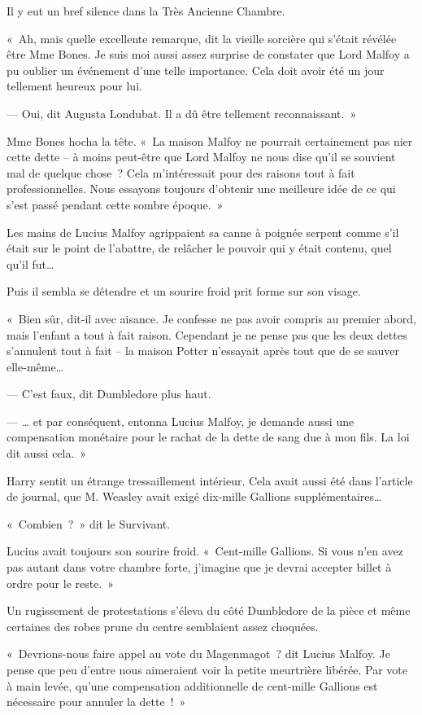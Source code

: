 Il y eut un bref silence dans la Très Ancienne Chambre.

«~Ah, mais quelle excellente remarque, dit la vieille sorcière qui s'était révélée être Mme Bones. Je suis moi aussi assez surprise de constater que Lord Malfoy a pu oublier un événement d'une telle importance. Cela doit avoir été un jour tellement heureux pour lui.

--- Oui, dit Augusta Londubat. Il a dû être tellement reconnaissant.~»

Mme Bones hocha la tête. «~La maison Malfoy ne pourrait certainement pas nier cette dette -- à moins peut-être que Lord Malfoy ne nous dise qu'il se souvient mal de quelque chose~? Cela m'intéressait pour des raisons tout à fait professionnelles. Nous essayons toujours d'obtenir une meilleure idée de ce qui s'est passé pendant cette sombre époque.~»

Les mains de Lucius Malfoy agrippaient sa canne à poignée serpent comme s'il était sur le point de l'abattre, de relâcher le pouvoir qui y était contenu, quel qu'il fut…

Puis il sembla se détendre et un sourire froid prit forme sur son visage.

«~Bien sûr, dit-il avec aisance. Je confesse ne pas avoir compris au premier abord, mais l'enfant a tout à fait raison. Cependant je ne pense pas que les deux dettes s'annulent tout à fait -- la maison Potter n'essayait après tout que de se sauver elle-même…

--- C'est faux, dit Dumbledore plus haut.

--- … et par conséquent, entonna Lucius Malfoy, je demande aussi une compensation monétaire pour le rachat de la dette de sang due à mon fils. La loi dit aussi cela.~»

Harry sentit un étrange tressaillement intérieur. Cela avait aussi été dans l'article de journal, que M. Weasley avait exigé dix-mille Gallions supplémentaires…

«~Combien~?~» dit le Survivant.

Lucius avait toujours son sourire froid. «~Cent-mille Gallions. Si vous n'en avez pas autant dans votre chambre forte, j'imagine que je devrai accepter billet à ordre pour le reste.~»

Un rugissement de protestations s'éleva du côté Dumbledore de la pièce et même certaines des robes prune du centre semblaient assez choquées.

«~Devrions-nous faire appel au vote du Magenmagot~? dit Lucius Malfoy. Je pense que peu d'entre nous aimeraient voir la petite meurtrière libérée. Par vote à main levée, qu'une compensation additionnelle de cent-mille Gallions est nécessaire pour annuler la dette~!~»

